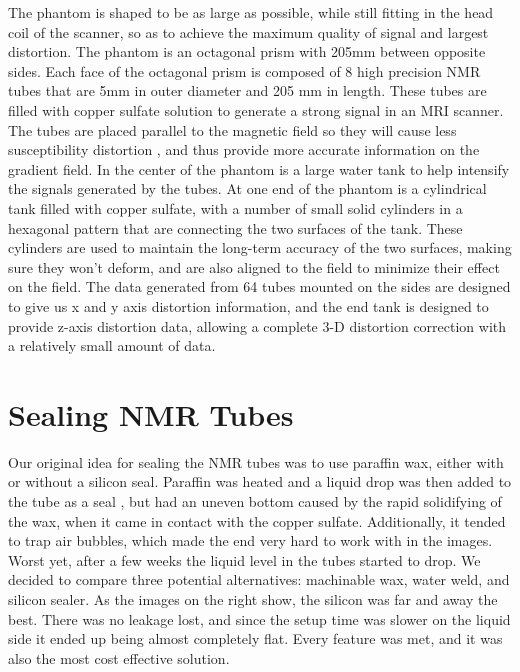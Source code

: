 The phantom is shaped to be as large as possible, while still fitting in the head coil of the scanner, so as 
to achieve the maximum quality of signal and largest distortion. The phantom is an octagonal prism with 205mm 
between opposite sides.  Each face of the octagonal prism is composed of 8 high precision NMR tubes that are 
5mm in outer diameter and 205 mm in length. These tubes are filled with copper sulfate solution to generate a 
strong signal in an MRI scanner.  The tubes are placed parallel to the magnetic field so they will cause less 
susceptibility distortion \cite{mag_susceptibility}, 
and thus provide more accurate information on the gradient field.  In the 
center of the phantom is a large water tank to help intensify the signals generated by the tubes. At one end 
of the phantom is a cylindrical tank filled with copper sulfate, with a number of small solid cylinders in a 
hexagonal pattern that are connecting the two surfaces of the tank. These cylinders are used to maintain the 
long-term accuracy of the two surfaces, making sure they won’t deform, and are also aligned to the field to 
minimize their effect on the field.  The data generated from 64 tubes mounted on the sides are designed to 
give us x and y axis distortion information, and the end tank is designed to provide z-axis distortion data, 
allowing a complete 3-D distortion correction with a relatively small amount of data. 

\section{Sealing NMR Tubes}

Our original idea for sealing the NMR tubes was to use paraffin wax, either with or without a silicon seal.  
Paraffin was heated and a liquid drop was then added to the tube as a seal , but had an uneven bottom caused 
by the rapid solidifying of the wax, when it came in contact with the copper sulfate.  Additionally, 
it tended to trap air bubbles, which made the end very hard to work with in the images.  Worst yet, after a 
few weeks the liquid level in the tubes started to drop.  We decided to compare three potential alternatives: 
machinable wax, water weld, and silicon sealer.  As the images on the right show, the silicon was far and 
away the best.  There was no leakage lost, and since the setup time was slower on the liquid side it ended 
up being almost completely flat.  Every feature was met, and it was also the most cost effective solution.

